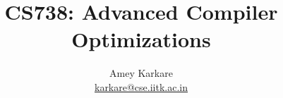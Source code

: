 \setfootline{\insertshortauthor, \insertshortinstitute
  \hfill   \insertshorttitle
  \hfill \insertframenumber/\inserttotalframenumber} 
\newcommand{\mypart}[1]{%
  \frame[plain]{\mbox{}\vfill \psshadowbox{\huge #1} \vfill\mbox{}}
}
\author[karkare]{Amey Karkare \\ \url{karkare@cse.iitk.ac.in}}
\date[]{}%
\title[CS738]{CS738: Advanced Compiler Optimizations}
\subtitle[]{}

